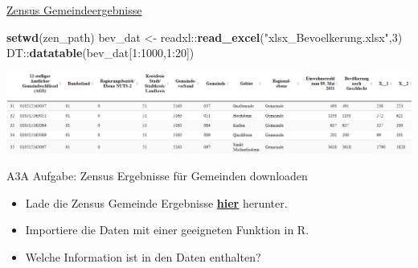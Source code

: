 \documentclass[ignorenonframetext,]{beamer}
\newenvironment{Shaded}{\begin{snugshade}}{\end{snugshade}}
\newcommand{\DecValTok}[1]{\textcolor[rgb]{0.27,0.67,0.26}{#1}}
\newcommand{\KeywordTok}[1]{\textcolor[rgb]{0.26,0.66,0.93}{\textbf{#1}}}
\newcommand{\NormalTok}[1]{\textcolor[rgb]{0.74,0.68,0.62}{#1}}
\newcommand{\OperatorTok}[1]{\textcolor[rgb]{0.74,0.68,0.62}{#1}}
\newcommand{\StringTok}[1]{\textcolor[rgb]{0.02,0.61,0.04}{#1}}
\providecommand{\tightlist}{%
  \setlength{\itemsep}{0pt}\setlength{\parskip}{0pt}}
\begin{document}
\begin{frame}[fragile]{\href{https://www.destatis.de/DE/Methoden/Zensus_/Zensus.html}{Zensus
Gemeindeergebnisse}}
\protect\hypertarget{zensus-gemeindeergebnisse}{}

\begin{Shaded}
\begin{Highlighting}[]
\KeywordTok{setwd}\NormalTok{(zen_path)}
\NormalTok{bev_dat <-}\StringTok{ }\NormalTok{readxl}\OperatorTok{::}\KeywordTok{read_excel}\NormalTok{(}\StringTok{"xlsx_Bevoelkerung.xlsx"}\NormalTok{,}\DecValTok{3}\NormalTok{)}
\NormalTok{DT}\OperatorTok{::}\KeywordTok{datatable}\NormalTok{(bev_dat[}\DecValTok{1}\OperatorTok{:}\DecValTok{1000}\NormalTok{,}\DecValTok{1}\OperatorTok{:}\DecValTok{20}\NormalTok{])}
\end{Highlighting}
\end{Shaded}

\includegraphics{figure/ZensusTabEx.PNG}

\end{frame}

\begin{frame}{A3A Aufgabe: Zensus Ergebnisse für Gemeinden downloaden}
\protect\hypertarget{a3a-aufgabe-zensus-ergebnisse-fur-gemeinden-downloaden}{}

\begin{itemize}
\tightlist
\item
  Lade die Zensus Gemeinde Ergebnisse
  \href{https://www.zensus2011.de/SharedDocs/Aktuelles/Ergebnisse/DemografischeGrunddaten.html}{\textbf{hier}}
  herunter.
\item
  Importiere die Daten mit einer geeigneten Funktion in R.
\item
  Welche Information ist in den Daten enthalten?
\end{itemize}

\end{frame}
\end{document}
